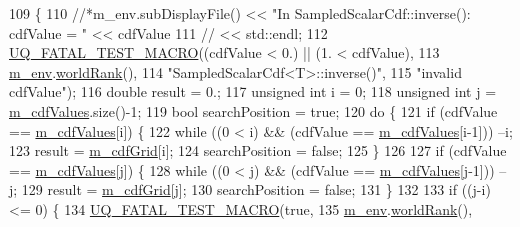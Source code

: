 \begin{DoxyCode}
109 \{
110   \textcolor{comment}{//*m\_env.subDisplayFile() << "In SampledScalarCdf::inverse(): cdfValue = " << cdfValue}
111   \textcolor{comment}{//                       << std::endl;}
112   \hyperlink{_defines_8h_a56d63d18d0a6d45757de47fcc06f574d}{UQ\_FATAL\_TEST\_MACRO}((cdfValue < 0.) || (1. < cdfValue),
113                       \hyperlink{class_q_u_e_s_o_1_1_base_scalar_cdf_a3caa986ae1ccef96a28b0365fb88c86c}{m\_env}.\hyperlink{class_q_u_e_s_o_1_1_base_environment_a78b57112bbd0e6dd0e8afec00b40ffa7}{worldRank}(),
114                       \textcolor{stringliteral}{"SampledScalarCdf<T>::inverse()"},
115                       \textcolor{stringliteral}{"invalid cdfValue"});
116   \textcolor{keywordtype}{double} result = 0.;
117   \textcolor{keywordtype}{unsigned} \textcolor{keywordtype}{int} i = 0;
118   \textcolor{keywordtype}{unsigned} \textcolor{keywordtype}{int} j = \hyperlink{class_q_u_e_s_o_1_1_sampled_scalar_cdf_ab8cf649637f31cc75c9f676d5927c10f}{m\_cdfValues}.size()-1;
119   \textcolor{keywordtype}{bool} searchPosition = \textcolor{keyword}{true};
120   \textcolor{keywordflow}{do} \{
121     \textcolor{keywordflow}{if} (cdfValue == \hyperlink{class_q_u_e_s_o_1_1_sampled_scalar_cdf_ab8cf649637f31cc75c9f676d5927c10f}{m\_cdfValues}[i]) \{
122       \textcolor{keywordflow}{while} ((0 < i) && (cdfValue == \hyperlink{class_q_u_e_s_o_1_1_sampled_scalar_cdf_ab8cf649637f31cc75c9f676d5927c10f}{m\_cdfValues}[i-1])) --i;
123       result = \hyperlink{class_q_u_e_s_o_1_1_sampled_scalar_cdf_a58d6744bac9ce8d906839bf381517f4a}{m\_cdfGrid}[i];
124       searchPosition = \textcolor{keyword}{false};
125     \}
126     
127     \textcolor{keywordflow}{if} (cdfValue == \hyperlink{class_q_u_e_s_o_1_1_sampled_scalar_cdf_ab8cf649637f31cc75c9f676d5927c10f}{m\_cdfValues}[j]) \{
128       \textcolor{keywordflow}{while} ((0 < j) && (cdfValue == \hyperlink{class_q_u_e_s_o_1_1_sampled_scalar_cdf_ab8cf649637f31cc75c9f676d5927c10f}{m\_cdfValues}[j-1])) --j;
129       result = \hyperlink{class_q_u_e_s_o_1_1_sampled_scalar_cdf_a58d6744bac9ce8d906839bf381517f4a}{m\_cdfGrid}[j];
130       searchPosition = \textcolor{keyword}{false};
131     \}
132 
133     \textcolor{keywordflow}{if} ((j-i) <= 0) \{
134       \hyperlink{_defines_8h_a56d63d18d0a6d45757de47fcc06f574d}{UQ\_FATAL\_TEST\_MACRO}(\textcolor{keyword}{true},
135                           \hyperlink{class_q_u_e_s_o_1_1_base_scalar_cdf_a3caa986ae1ccef96a28b0365fb88c86c}{m\_env}.\hyperlink{class_q_u_e_s_o_1_1_base_environment_a78b57112bbd0e6dd0e8afec00b40ffa7}{worldRank}(),

\end{DoxyCode}
